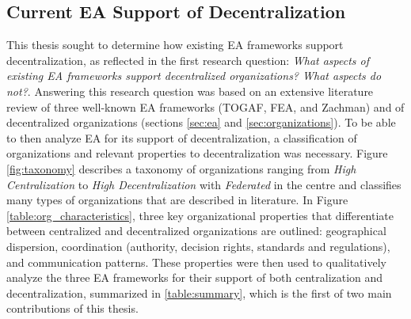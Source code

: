 %
%
%
\subsection{Current EA Support of Decentralization}

This thesis sought to determine how existing EA frameworks support decentralization, as reflected in the first research question: \textit{What aspects of existing EA frameworks support decentralized organizations? What aspects do not?}. Answering this research question was based on an extensive literature review of three well-known EA frameworks (TOGAF, FEA, and Zachman) and of decentralized organizations (sections \ref{sec:ea} and \ref{sec:organizations}). To be able to then analyze EA for its support of decentralization, a classification of organizations and relevant properties to decentralization was necessary. Figure \ref{fig:taxonomy} describes a taxonomy of organizations ranging from \textit{High Centralization} to \textit{High Decentralization} with \textit{Federated} in the centre and classifies many types of organizations that are described in literature. In Figure \ref{table:org_characteristics}, three key organizational properties that differentiate between centralized and decentralized organizations are outlined: geographical dispersion, coordination (authority, decision rights, standards and regulations), and communication patterns. These properties were then used to qualitatively analyze the three EA frameworks for their support of both centralization and decentralization, summarized in \ref{table:summary}, which is the first of two main contributions of this thesis.

